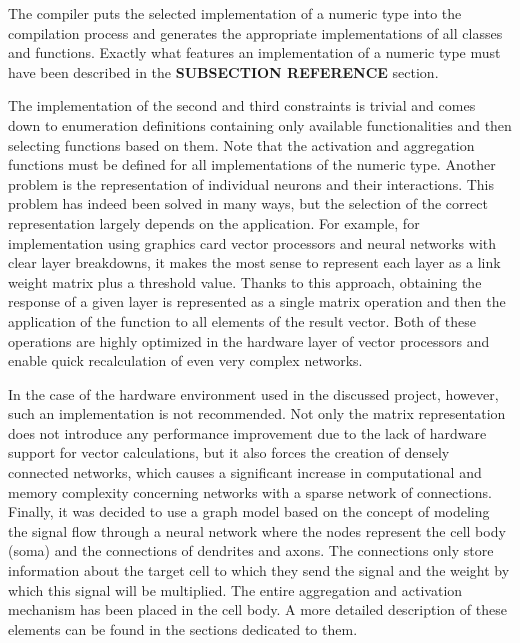 The compiler puts the selected implementation of a numeric type into the compilation process 
and generates the appropriate implementations of all classes and functions. 
Exactly what features an implementation of a numeric type must have been described in the 
\textbf{SUBSECTION REFERENCE} section.

The implementation of the second and third constraints is trivial and comes down to 
enumeration definitions containing only available functionalities and then selecting functions 
based on them. 
Note that the activation and aggregation functions must be defined for all implementations of 
the numeric type.
Another problem is the representation of individual neurons and their interactions. 
This problem has indeed been solved in many ways, but the selection of the correct representation 
largely depends on the application.
For example, for implementation using graphics card vector processors and neural networks with 
clear layer breakdowns, it makes the most sense to represent each layer as a link weight matrix 
plus a threshold value. 
Thanks to this approach, obtaining the response of a given layer is represented as a single matrix 
operation and then the application of the function to all elements of the result vector. 
Both of these operations are highly optimized in the hardware layer of vector processors and enable 
quick recalculation of even very complex networks.

In the case of the hardware environment used in the discussed project, however, such an 
implementation is not recommended. 
Not only the matrix representation does not introduce any performance improvement due to the 
lack of hardware support for vector calculations, but it also forces the creation of densely 
connected networks, which causes a significant increase in computational and memory complexity 
concerning networks with a sparse network of connections.
Finally, it was decided to use a graph model based on the concept of modeling the signal flow 
through a neural network where the nodes represent the cell body (soma) and the connections of 
dendrites and axons. 
The connections only store information about the target cell to which they send the signal and 
the weight by which this signal will be multiplied. 
The entire aggregation and activation mechanism has been placed in the cell body. 
A more detailed description of these elements can be found in the sections dedicated to them.
